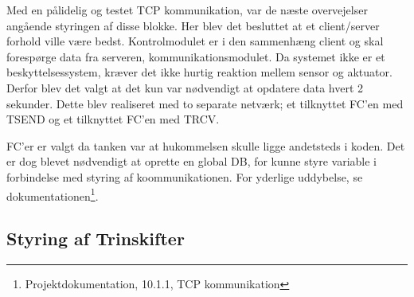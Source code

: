 Med en pålidelig og testet TCP kommunikation, var de næste overvejelser angående styringen af disse blokke. Her blev det besluttet at et client/server forhold ville være bedst. Kontrolmodulet er i den sammenhæng client og skal forespørge data fra serveren, kommunikationsmodulet.
Da systemet ikke er et beskyttelsessystem, kræver det ikke hurtig reaktion mellem sensor og aktuator. Derfor blev det valgt at det kun var nødvendigt at opdatere data hvert 2 sekunder. Dette blev realiseret med to separate netværk; et tilknyttet FC'en med TSEND og et tilknyttet FC'en med TRCV.


FC'er er valgt da tanken var at hukommelsen skulle ligge andetsteds i koden. Det er dog blevet nødvendigt at oprette en global DB, for kunne styre variable i forbindelse med styring af koommunikationen. For yderlige uddybelse, se dokumentationen\footnote{Projektdokumentation, 10.1.1, TCP kommunikation}.

\subsection{Styring af Trinskifter}


